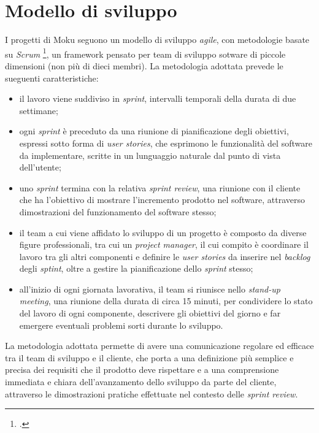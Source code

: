 \section{Modello di sviluppo}
I progetti di Moku seguono un modello di sviluppo \emph{agile}, con metodologie basate su \emph{Scrum} \footcite{site:scrum-guide}, un framework pensato per team di sviluppo sotware di piccole dimensioni (non più di dieci membri). La metodologia adottata prevede le sueguenti caratteristiche:
\begin{itemize}
	\item il lavoro viene suddiviso in \emph{sprint}, intervalli temporali della durata di due settimane;
	\item ogni \emph{sprint} è preceduto da una riunione di pianificazione degli obiettivi, espressi sotto forma di \emph{user stories}, che esprimono le funzionalità del software da implementare, scritte in un lunguaggio naturale dal punto di vista dell'utente;
	\item uno \emph{sprint} termina con la relativa \emph{sprint review}, una riunione con il cliente che ha l'obiettivo di mostrare l'incremento prodotto nel software, attraverso dimostrazioni del funzionamento del software stesso;
	\item il team a cui viene affidato lo sviluppo di un progetto è composto da diverse figure professionali, tra cui un \emph{project manager}, il cui compito è coordinare il lavoro tra gli altri componenti e definire le \emph{user stories} da inserire nel \emph{backlog} degli \emph{sptint}, oltre a gestire la pianificazione dello \emph{sprint} stesso;
	\item all'inizio di ogni giornata lavorativa, il team si riunisce nello \emph{stand-up meeting}, una riunione della durata di circa 15 minuti, per condividere lo stato del lavoro di ogni componente, descrivere gli obiettivi del giorno e far emergere eventuali problemi sorti durante lo sviluppo.
\end{itemize}
La metodologia adottata permette di avere una comunicazione regolare ed efficace tra il team di sviluppo e il cliente, che porta a una definizione più semplice e precisa dei requisiti che il prodotto deve rispettare e a una comprensione immediata e chiara dell'avanzamento dello sviluppo da parte del cliente, attraverso le dimostrazioni pratiche effettuate nel contesto delle \emph{sprint review}.

